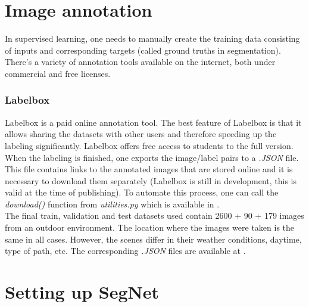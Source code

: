 \newpage
\section{Image annotation}

In supervised learning, one needs to manually create the training data consisting of inputs and corresponding targets (called ground truths in segmentation). There's a variety of annotation tools available on the internet, both under commercial and free licenses. 

\subsubsection{Labelbox}

Labelbox \cite{labelbox} is a paid online annotation tool. The best feature of Labelbox is that it allows sharing the datasets with other users and therefore speeding up the labeling significantly. Labelbox offers free access to students to the full version. When the labeling is finished, one exports the image/label pairs to a \textit{.JSON} file. This file contains links to the annotated images that are stored online and it is necessary to download them separately (Labelbox is still in development, this is valid at the time of publishing). To automate this process, one can call the \textit{download()} function from \textit{utilities.py} which is available in \cite{filip_github}. \\

The final train, validation and test datasets used contain 2600 + 90 + 179 images from an outdoor environment. The location where the images were taken is the same in all cases. However, the scenes differ in their weather conditions, daytime, type of path, etc. The corresponding \textit{.JSON} files are available at \cite{filip_github}.



\section{Setting up SegNet}

